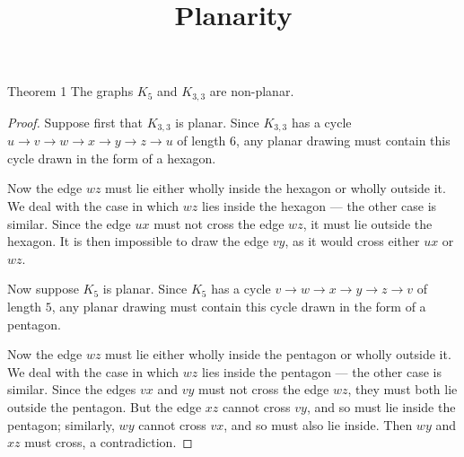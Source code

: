\documentclass[11pt]{scrartcl}
\title{\color{accentblue}Planarity}
\author{}
\date{}
\theoremstyle{plain}
\theoremstyle{remark}
\begin{document}
\maketitle

\begin{thmbox}{Theorem 1}
The graphs $K_5$ and $K_{3,3}$ are non-planar.
\end{thmbox}

\begin{proof}
Suppose first that $K_{3,3}$ is planar. Since $K_{3,3}$ has a cycle $u \to v \to w \to x \to y \to z \to u$ of length $6$, any planar drawing must contain this cycle drawn in the form of a hexagon.

Now the edge $wz$ must lie either wholly inside the hexagon or wholly outside it. We deal with the case in which $wz$ lies inside the hexagon --- the other case is similar. Since the edge $ux$ must not cross the edge $wz$, it must lie outside the hexagon. It is then impossible to draw the edge $vy$, as it would cross either $ux$ or $wz$.

\begin{center}
\end{center}

Now suppose $K_5$ is planar. Since $K_5$ has a cycle $v \to w \to x \to y \to z \to v$ of length $5$, any planar drawing must contain this cycle drawn in the form of a pentagon.

Now the edge $wz$ must lie either wholly inside the pentagon or wholly outside it. We deal with the case in which $wz$ lies inside the pentagon --- the other case is similar. Since the edges $vx$ and $vy$ must not cross the edge $wz$, they must both lie outside the pentagon. But the edge $xz$ cannot cross $vy$, and so must lie inside the pentagon; similarly, $wy$ cannot cross $vx$, and so must also lie inside. Then $wy$ and $xz$ must cross, a contradiction.


\end{proof}
\end{document}
